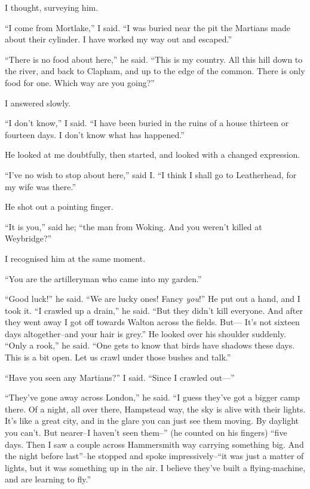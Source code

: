 I thought, surveying him.

``I come from Mortlake,'' I said. ``I was buried near the pit the
Martians made about their cylinder. I have worked my way out and
escaped.''

``There is no food about here,'' he said. ``This is my country. All
this hill down to the river, and back to Clapham, and up to the
edge of the common. There is only food for one. Which way are you
going?''

I answered slowly.

``I don't know,'' I said. ``I have been buried in the ruins of a house
thirteen or fourteen days. I don't know what has happened.''

He looked at me doubtfully, then started, and looked with a changed
expression.

``I've no wish to stop about here,'' said I. ``I think I shall go to
Leatherhead, for my wife was there.''

He shot out a pointing finger.

``It is you,'' said he; ``the man from Woking. And you weren't killed
at Weybridge?''

I recognised him at the same moment.

``You are the artilleryman who came into my garden.''

``Good luck!'' he said. ``We are lucky ones! Fancy \emph{you}!'' He put
out a hand, and I took it. ``I crawled up a drain,'' he said. ``But
they didn't kill everyone. And after they went away I got off
towards Walton across the fields. But--- It's not sixteen days
altogether--and your hair is grey.'' He looked over his shoulder
suddenly. ``Only a rook,'' he said. ``One gets to know that birds have
shadows these days. This is a bit open. Let us crawl under those
bushes and talk.''

``Have you seen any Martians?'' I said. ``Since I crawled out---''

``They've gone away across London,'' he said. ``I guess they've got a
bigger camp there. Of a night, all over there, Hampstead way, the
sky is alive with their lights. It's like a great city, and in the
glare you can just see them moving. By daylight you can't. But
nearer--I haven't seen them--'' (he counted on his fingers) ``five
days. Then I saw a couple across Hammersmith way carrying something
big. And the night before last''--he stopped and spoke
impressively--``it was just a matter of lights, but it was something
up in the air. I believe they've built a flying-machine, and are
learning to fly.''

